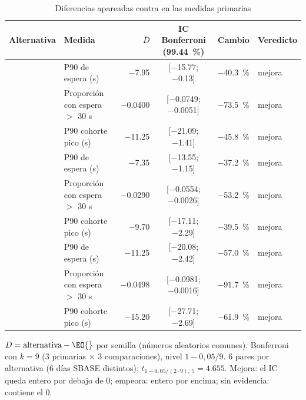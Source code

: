 \begin{table}[H]
\centering
\caption{Diferencias apareadas contra \EO{} en las medidas primarias}
\label{tab:diferencias}
\small
\begin{tabular}{@{}llrcrl@{}}
\toprule
Alternativa & Medida & $\bar D$ & IC Bonferroni (\num{99.44}~\%) & Cambio & Veredicto \\
\midrule
\EI{} & P90 de espera (s) & \num{-7.95} & [\num{-15.77}; \num{-0.13}] & \num{-40.3}~\% & mejora \\
 & Proporción con espera $>$ 30 s & \num{-0.0400} & [\num{-0.0749}; \num{-0.0051}] & \num{-73.5}~\% & mejora \\
 & P90 cohorte pico (s) & \num{-11.25} & [\num{-21.09}; \num{-1.41}] & \num{-45.8}~\% & mejora \\
\midrule
\ET{} & P90 de espera (s) & \num{-7.35} & [\num{-13.55}; \num{-1.15}] & \num{-37.2}~\% & mejora \\
 & Proporción con espera $>$ 30 s & \num{-0.0290} & [\num{-0.0554}; \num{-0.0026}] & \num{-53.2}~\% & mejora \\
 & P90 cohorte pico (s) & \num{-9.70} & [\num{-17.11}; \num{-2.29}] & \num{-39.5}~\% & mejora \\
\midrule
\EIT{} & P90 de espera (s) & \num{-11.25} & [\num{-20.08}; \num{-2.42}] & \num{-57.0}~\% & mejora \\
 & Proporción con espera $>$ 30 s & \num{-0.0498} & [\num{-0.0981}; \num{-0.0016}] & \num{-91.7}~\% & mejora \\
 & P90 cohorte pico (s) & \num{-15.20} & [\num{-27.71}; \num{-2.69}] & \num{-61.9}~\% & mejora \\
\bottomrule
\end{tabular}

\smallskip
\footnotesize $D = \text{alternativa} - \EO{}$ por semilla (números aleatorios comunes). Bonferroni con $k = 9$
(3 primarias $\times$ 3 comparaciones), nivel $1 - 0{,}05/9$. 6 pares por alternativa (6 días SBASE distintos); $t_{1-0{,}05/(2\cdot9),\,5} = \num{4.655}$.
Mejora: el IC queda entero por debajo de 0; empeora: entero por encima; sin evidencia: contiene el 0.
\end{table}
